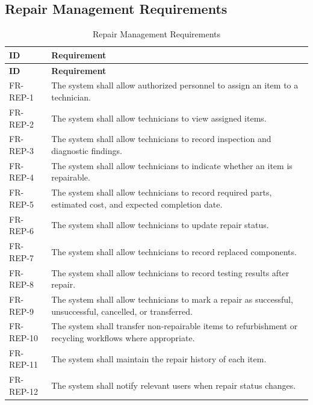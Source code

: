 \subsection{Repair Management Requirements}
\begin{longtable}{@{}p{2.4cm}p{11cm}@{}}
\caption{Repair Management Requirements} \label{tab:fr-rep} \\
\toprule \textbf{ID} & \textbf{Requirement} \\ \midrule
\endfirsthead
\toprule \textbf{ID} & \textbf{Requirement} \\ \midrule
\endhead
FR-REP-1 & The system shall allow authorized personnel to assign an item to a technician. \\
FR-REP-2 & The system shall allow technicians to view assigned items. \\
FR-REP-3 & The system shall allow technicians to record inspection and diagnostic findings. \\
FR-REP-4 & The system shall allow technicians to indicate whether an item is repairable. \\
FR-REP-5 & The system shall allow technicians to record required parts, estimated cost, and expected completion date. \\
FR-REP-6 & The system shall allow technicians to update repair status. \\
FR-REP-7 & The system shall allow technicians to record replaced components. \\
FR-REP-8 & The system shall allow technicians to record testing results after repair. \\
FR-REP-9 & The system shall allow technicians to mark a repair as successful, unsuccessful, cancelled, or transferred. \\
FR-REP-10 & The system shall transfer non-repairable items to refurbishment or recycling workflows where appropriate. \\
FR-REP-11 & The system shall maintain the repair history of each item. \\
FR-REP-12 & The system shall notify relevant users when repair status changes. \\
\bottomrule
\end{longtable}

